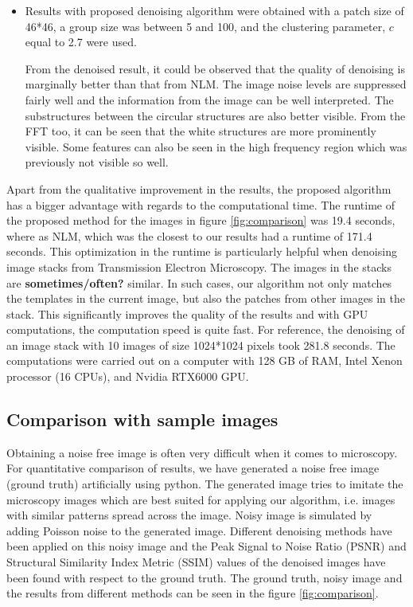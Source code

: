 \documentclass[fleqn,10pt]{wlscirep}
\begin{document}
\begin{itemize}
		\item Results with proposed denoising algorithm were obtained with a patch size of 46*46, a group size was between 5 and 100, and the clustering parameter, $c$ equal to 2.7 were used. 
		
		From the denoised result, it could be observed that the quality of denoising is marginally better than that from NLM. The image noise levels are suppressed fairly well and the information from the image can be well interpreted. The substructures between the circular structures are also better visible. From the FFT too, it can be seen that the white structures are more prominently visible. Some features can also be seen in the high frequency region which was previously not visible so well.
	\end{itemize}
	
	Apart from the qualitative improvement in the results, the proposed algorithm has a bigger advantage with regards to the computational time. The runtime of the proposed method for the images in figure \ref{fig:comparison} was 19.4 seconds, where as NLM, which was the closest to our results had a runtime of 171.4 seconds. This optimization in the runtime is particularly helpful when denoising image stacks from Transmission Electron Microscopy. The images in the stacks are \textbf{sometimes/often?} similar. In such cases, our algorithm not only matches the templates in the current image, but also the patches from other images in the stack. This significantly improves the quality of the results and with GPU computations, the computation speed is quite fast. For reference, the denoising of an image stack with 10 images of size 1024*1024 pixels took 281.8 seconds. The computations were carried out on a computer with 128 GB of RAM, Intel Xenon processor (16 CPUs), and Nvidia RTX6000 GPU.
	
	\subsection*{Comparison with sample images}
	
	Obtaining a noise free image is often very difficult when it comes to microscopy. For quantitative comparison of results, we have generated a noise free image (ground truth) artificially using python. The generated image tries to imitate the microscopy images which are best suited for applying our algorithm, i.e. images with similar patterns spread across the image. Noisy image is simulated by adding Poisson noise to the generated image. Different denoising methods have been applied on this noisy image and the Peak Signal to Noise Ratio (PSNR) and Structural Similarity Index Metric (SSIM) values of the denoised images have been found with respect to the ground truth. The ground truth, noisy image and the results from different methods can be seen in the figure \ref{fig:comparison}. 
	
\end{document}
